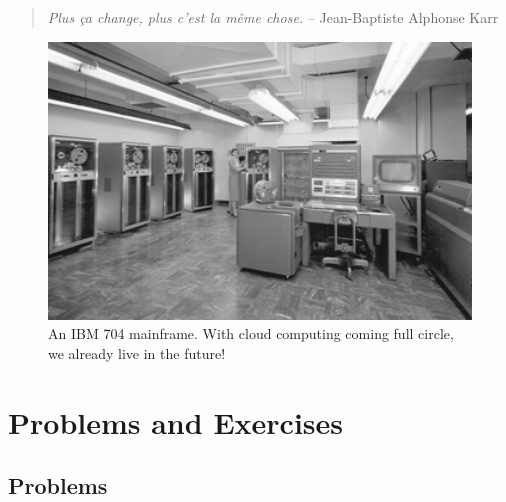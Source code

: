 \begin{quote}
{\em Plus \c{c}a change, plus c'est la m\^{e}me chose.}
-- Jean-Baptiste Alphonse Karr
\end{quote}
\vfill

\begin{figure}[hb]
	\includegraphics[width=1\textwidth]{01/pics/Ibm704}
	\caption[An IBM 704 mainframe]{An IBM 704 mainframe.
		With cloud computing coming full
		circle, we already live in the future!
		\label{fig:mainframe}}
\end{figure}

\pagebreak

\chapter*{Problems and Exercises}
\section*{Problems}

